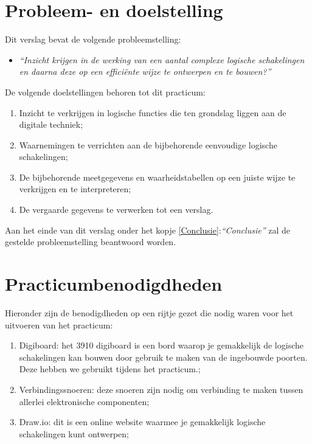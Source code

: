 \documentclass[12pt]{article}
\begin{document}
\section{Probleem- en doelstelling}
\label{Problem}
Dit verslag bevat de volgende probleemstelling:
\begin{itemize}
    \item \textit{``Inzicht krijgen in de werking van een aantal complexe logische schakelingen en daarna deze op een efficiënte wijze te ontwerpen en te bouwen?''}
\end{itemize}
\vspace{0,5cm}
De volgende doelstellingen behoren tot dit practicum:
\begin{enumerate}
    \item Inzicht te verkrijgen in logische functies die ten grondslag liggen aan de digitale techniek;
    \item Waarnemingen te verrichten aan de bijbehorende eenvoudige logische schakelingen;
    \item De bijbehorende meetgegevens en waarheidstabellen op een juiste wijze te verkrijgen en te interpreteren;
    \item De vergaarde gegevens te verwerken tot een verslag.
\end{enumerate}

\vspace{0,5cm}
Aan het einde van dit verslag onder het kopje \ref{Conclusie}:\textit{``Conclusie''} zal de gestelde probleemstelling beantwoord worden.
\pagebreak

\section{Practicumbenodigdheden}
\label{practicumbenodigdheden}
Hieronder zijn de benodigdheden op een rijtje gezet die nodig waren voor het uitvoeren van het practicum:
\begin{enumerate}
    \item Digiboard: het 3910 digiboard is een bord waarop je gemakkelijk de logische schakelingen kan bouwen door gebruik te maken van de ingebouwde poorten. Deze hebben we gebruikt tijdens het practicum.\cite{hps-systemtechnik_ds_DIGI};
    \item Verbindingssnoeren: deze snoeren zijn nodig om verbinding te maken tussen allerlei elektronische componenten; 
    \item Draw.io: dit is een online website waarmee je gemakkelijk logische schakelingen kunt ontwerpen;
\end{enumerate}
\pagebreak
\end{document}
